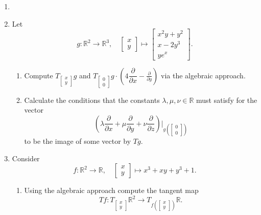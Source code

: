 \documentclass{article}
\begin{document}
\begin{enumerate}[start=19]
  \item
  \item Let
  $$
  g:\mathbb{R}^{2}\rightarrow\mathbb{R}^{3},\quad
  \begin{bmatrix}x\\y\end{bmatrix}\mapsto
  \begin{bmatrix}x^{2}y+y^{2}\\x-2y^{3}\\ye^{x}\end{bmatrix}.
  $$

  \begin{enumerate}
    \item Compute $T_{\left[\begin{smallmatrix}x\\y\end{smallmatrix}\right]}g$ and $T_{\left[\begin{smallmatrix}0\\0\end{smallmatrix}\right]}g\cdot\left(4\dfrac{\partial}{\partial x}-\frac{\partial}{\partial y}\right)$ via the algebraic approach.
    \item Calculate the conditions that the constants $\lambda,\mu,\nu\in\mathbb{R}$ must satisfy for the vector
    $$
    \left(\lambda\frac{\partial}{\partial x}+\mu\frac{\partial}{\partial y}+\nu\frac{\partial}{\partial z}\right)
    \Bigg|_{g\left(\left[\begin{smallmatrix}0\\0\end{smallmatrix}\right]\right)}
    $$
    to be the image of some vector by $Tg$.
  \end{enumerate}

  \item Consider
  $$
  f:\mathbb{R}^{2}\rightarrow\mathbb{R},\quad
  \begin{bmatrix}x\\y\end{bmatrix}\mapsto
  x^{3}+xy+y^{3}+1.
  $$

  \begin{enumerate}
    \item Using the algebraic approach compute the tangent map
    $$
    Tf:T_{\left[\begin{smallmatrix}x\\y\end{smallmatrix}\right]}\mathbb{R}^{2}
    \rightarrow T_{f\left(\left[\begin{smallmatrix}x\\y\end{smallmatrix}\right]\right)}\mathbb{R}.
    $$


\end{enumerate}
\end{enumerate}
\end{document}
